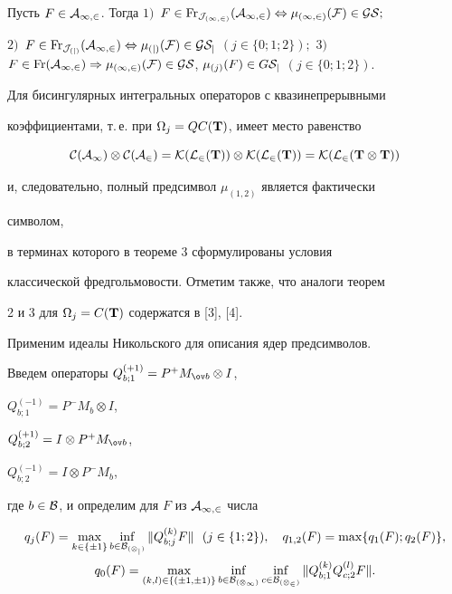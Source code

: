  


\begin{thm} 


Пусть $F\in\cal A_{1,2}$. Тогда $1)$~$F\in\Fr_{\cal J_{(1,2)}}(\cal 


A_{1,2})\Leftrightarrow \mu_{(1,2)}(F)\in G\cal S;$ 


$2)$~$F\in\Fr_{\cal J_{(j)}}(\cal A_{1,2})\Leftrightarrow \mu_{(j)}(F)\in 


G\cal S_j$ $(j\in\{0;1;2\});$ $3)$~$F\in\Fr(\cal A_{1,2})\Rightarrow 


\mu_{(1,2)}(F)\in G\cal S$, $\mu_{(j)}(F)\in G\cal S_j$ $(j\in\{0;1;2\})$. 


\end{thm} 


 


 


Для бисингулярных интегральных операторов с квазинепрерывными 


коэффициентами, т.\,е. при $\Omega_j=QC(\bold T)$, имеет место равенство 


$$ 


\cal C(\cal A_1)\otimes\cal C(\cal A_2)=\cal K(L_2(\bold T)) 


\otimes\cal K(L_2(\bold T))=\cal K(L_2(\bold T\otimes\bold T))


$$ 


и, следовательно, полный предсимвол $\mu_{(1,2)}$ является фактически 


символом, 


в терминах которого в теореме 3 сформулированы условия 


классической фредгольмовости. Отметим также, что аналоги теорем 


2 и 3 для $\Omega_j=C(\bold T)$ содержатся в [3], [4]. 


 


Применим идеалы Никольского для описания ядер предсимволов. 


Введем операторы $Q^{(+1)}_{b;1}=P^+M_{\ov b}\otimes I$, 


$Q^{(-1)}_{b;1}=P^-M_b\otimes I$, 


$Q^{(+1)}_{b;2}=I\otimes P^+M_{\ov b}$, 


$Q^{(-1)}_{b;2}=I\otimes P^-M_b$, 


где $b\in\cal B$, и определим для $F$ из $\cal A_{1,2}$ числа 


\begin{gather*} 


q_j(F)=\max_{k\in\{\pm1\}}\inf_{b\in\cal B_{(\Omega_j)}} 


\|Q^{(k)}_{b;j}F\|\ \ (j\in\{1;2\}),\quad 


q_{1,2}(F)=\max\{q_1(F);q_2(F)\},\\ 


q_0(F)=\max_{(k,l)\in\{(\pm1,\pm1)\}} 


\inf_{b\in\cal B_{(\Omega_1)}}\inf_{c\in\cal B_{(\Omega_2)}} 


\|Q^{(k)}_{b;1}Q^{(l)}_{c;2}F\|. 


\end{gather*} 


